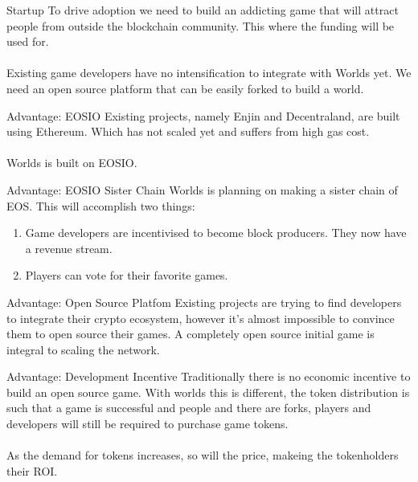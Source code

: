 \documentclass[aspectratio=169]{beamer}
\begin{document}
\begin{frame}{Startup}
    To drive adoption we need to build an addicting game that will attract people
    from outside the blockchain community. This where the funding will be used for.
    \\~\\
    Existing game developers have no intensification to integrate with Worlds
    yet.  We need an open source platform that can be easily forked to build a
    world.
\end{frame}


\begin{frame}{Advantage: EOSIO}
    Existing projects, namely Enjin and Decentraland, are built using Ethereum. Which
    has not scaled yet and suffers from high gas cost. 
    \\~\\
    Worlds is built on EOSIO. 
\end{frame}


\begin{frame}{Advantage: EOSIO Sister Chain}
    Worlds is planning on making a sister chain of EOS. This will accomplish two
    things: 
    \begin{enumerate}
        \item Game developers are incentivised to become block producers. They now have a revenue stream.
        \item Players can vote for their favorite games.
    \end{enumerate}
\end{frame}


\begin{frame}{Advantage: Open Source Platfom}
    Existing projects are trying to find developers to integrate their crypto ecosystem, however
    it's almost impossible to convince them to open source their games. A completely open
    source initial game is integral to scaling the network.
\end{frame}


\begin{frame}{Advantage: Development Incentive}
    Traditionally there is no economic incentive to build an open source game. With worlds
    this is different, the token distribution is such that a game is successful and people
    and there are forks, players and developers will still be required to purchase game tokens.
    \\~\\
    As the demand for tokens increases, so will the price, makeing the tokenholders their ROI.
\end{frame}
\end{document}
